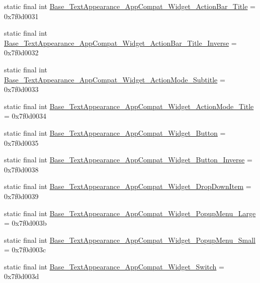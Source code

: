 \begin{DoxyCompactItemize}
\item 
static final int \mbox{\hyperlink{classcom_1_1google_1_1android_1_1gms_1_1R_1_1style_a9aa5a86e4c52ed2eeaec1c13c86067d4}{Base\+\_\+\+Text\+Appearance\+\_\+\+App\+Compat\+\_\+\+Widget\+\_\+\+Action\+Bar\+\_\+\+Title}} = 0x7f0d0031
\item 
static final int \mbox{\hyperlink{classcom_1_1google_1_1android_1_1gms_1_1R_1_1style_af89a1ec6d108b1206e1d617b04184baa}{Base\+\_\+\+Text\+Appearance\+\_\+\+App\+Compat\+\_\+\+Widget\+\_\+\+Action\+Bar\+\_\+\+Title\+\_\+\+Inverse}} = 0x7f0d0032
\item 
static final int \mbox{\hyperlink{classcom_1_1google_1_1android_1_1gms_1_1R_1_1style_afe741d431847b05a37aab6cae1149cd0}{Base\+\_\+\+Text\+Appearance\+\_\+\+App\+Compat\+\_\+\+Widget\+\_\+\+Action\+Mode\+\_\+\+Subtitle}} = 0x7f0d0033
\item 
static final int \mbox{\hyperlink{classcom_1_1google_1_1android_1_1gms_1_1R_1_1style_a4f3d8c83ba04475de0562205c8e7326a}{Base\+\_\+\+Text\+Appearance\+\_\+\+App\+Compat\+\_\+\+Widget\+\_\+\+Action\+Mode\+\_\+\+Title}} = 0x7f0d0034
\item 
static final int \mbox{\hyperlink{classcom_1_1google_1_1android_1_1gms_1_1R_1_1style_aa9c70ec0f311c32e6b4289a4f9a86610}{Base\+\_\+\+Text\+Appearance\+\_\+\+App\+Compat\+\_\+\+Widget\+\_\+\+Button}} = 0x7f0d0035
\item 
static final int \mbox{\hyperlink{classcom_1_1google_1_1android_1_1gms_1_1R_1_1style_ab89b80532f9d1b45b11ee099055ae36d}{Base\+\_\+\+Text\+Appearance\+\_\+\+App\+Compat\+\_\+\+Widget\+\_\+\+Button\+\_\+\+Inverse}} = 0x7f0d0038
\item 
static final int \mbox{\hyperlink{classcom_1_1google_1_1android_1_1gms_1_1R_1_1style_a12089a491cdedfd0e2bc1faa7c951092}{Base\+\_\+\+Text\+Appearance\+\_\+\+App\+Compat\+\_\+\+Widget\+\_\+\+Drop\+Down\+Item}} = 0x7f0d0039
\item 
static final int \mbox{\hyperlink{classcom_1_1google_1_1android_1_1gms_1_1R_1_1style_acf5743782e3a99718be2f7adce1e3f09}{Base\+\_\+\+Text\+Appearance\+\_\+\+App\+Compat\+\_\+\+Widget\+\_\+\+Popup\+Menu\+\_\+\+Large}} = 0x7f0d003b
\item 
static final int \mbox{\hyperlink{classcom_1_1google_1_1android_1_1gms_1_1R_1_1style_a463a195fb0d303e9faf2ec9f7f96b8e2}{Base\+\_\+\+Text\+Appearance\+\_\+\+App\+Compat\+\_\+\+Widget\+\_\+\+Popup\+Menu\+\_\+\+Small}} = 0x7f0d003c
\item 
static final int \mbox{\hyperlink{classcom_1_1google_1_1android_1_1gms_1_1R_1_1style_a4d3e48b7e2845b83b730801c635ae3d5}{Base\+\_\+\+Text\+Appearance\+\_\+\+App\+Compat\+\_\+\+Widget\+\_\+\+Switch}} = 0x7f0d003d

\end{DoxyCompactItemize}

